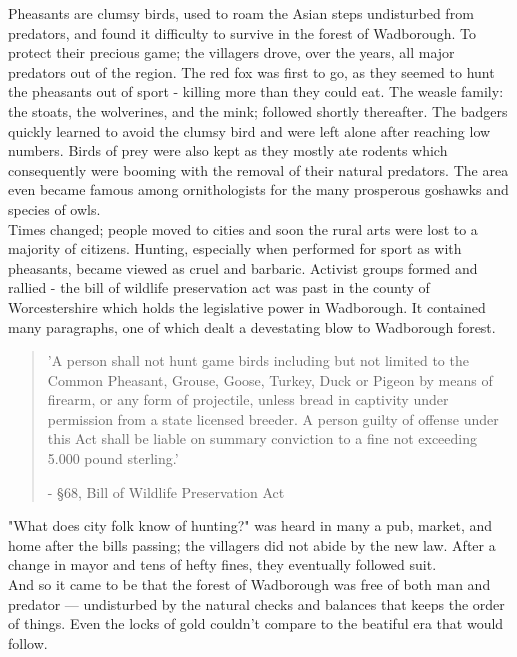 \documentclass[smalldemyvopaper,11pt,twoside,onecolumn,openright,extrafontsizes]{memoir}
\begin{document}
Pheasants are clumsy birds, used to roam the Asian steps undisturbed from predators, and found it difficulty to survive in the forest of Wadborough. To protect their precious game; the villagers drove, over the years, all major predators out of the region. The red fox was first to go, as they seemed to hunt the pheasants out of sport - killing more than they could eat. The weasle family: the stoats, the wolverines, and the mink; followed shortly thereafter. The badgers quickly learned to avoid the clumsy bird and were left alone after reaching low numbers. Birds of prey were also kept as they mostly ate rodents which consequently were booming with the removal of their natural predators. The area even became famous among ornithologists for the many prosperous goshawks and species of owls.\\

Times changed; people moved to cities and soon the rural arts were lost to a majority of citizens. Hunting, especially when performed for sport as with pheasants, became viewed as cruel and barbaric. Activist groups formed and rallied - the bill of wildlife preservation act was past in the county of Worcestershire which holds the legislative power in Wadborough. It contained many paragraphs, one of which dealt a devestating blow to Wadborough forest.

\begin{localsize}{10}
\begin{quote}
'A person shall not hunt game birds including but not limited to the Common Pheasant, Grouse, Goose, Turkey, Duck or Pigeon by means of firearm, or any form of projectile, unless bread in captivity under permission from a state licensed breeder. A person guilty of offense under this Act shall be liable on summary conviction to a fine not exceeding 5.000 pound sterling.'
\begin{flushright}- §68, Bill of Wildlife Preservation Act\end{flushright}
\end{quote} 
\end{localsize}

"What does city folk know of hunting?" was heard in many a pub, market, and home after the bills passing; the villagers did not abide by the new law. After a change in mayor and tens of hefty fines, they eventually followed suit.\\

And so it came to be that the forest of Wadborough was free of both man and predator — undisturbed by the natural checks and balances that keeps the order of things. Even the locks of gold couldn't compare to the beatiful era that would follow.
\end{document}
